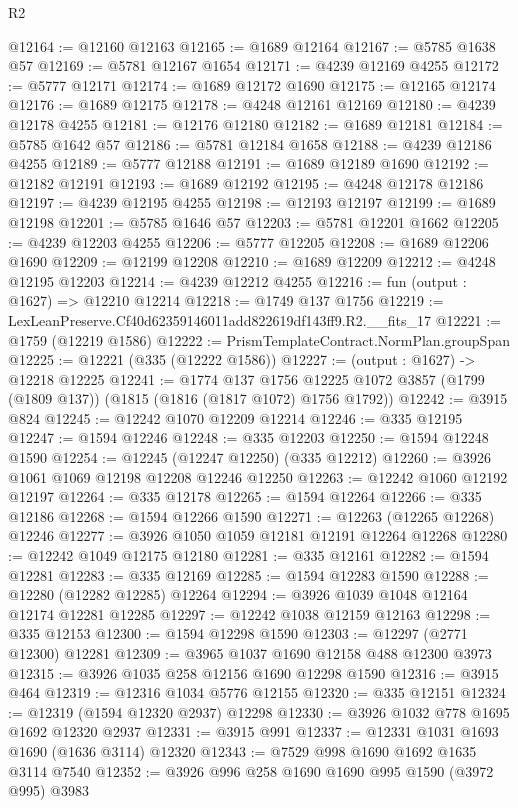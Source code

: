 \begin{lexlean}{R2}
\begin{coremodule}
@12164 := @12160 @12163
@12165 := @1689 @12164
@12167 := @5785 @1638 @57
@12169 := @5781 @12167 @1654
@12171 := @4239 @12169 @4255
@12172 := @5777 @12171
@12174 := @1689 @12172 @1690
@12175 := @12165 @12174
@12176 := @1689 @12175
@12178 := @4248 @12161 @12169
@12180 := @4239 @12178 @4255
@12181 := @12176 @12180
@12182 := @1689 @12181
@12184 := @5785 @1642 @57
@12186 := @5781 @12184 @1658
@12188 := @4239 @12186 @4255
@12189 := @5777 @12188
@12191 := @1689 @12189 @1690
@12192 := @12182 @12191
@12193 := @1689 @12192
@12195 := @4248 @12178 @12186
@12197 := @4239 @12195 @4255
@12198 := @12193 @12197
@12199 := @1689 @12198
@12201 := @5785 @1646 @57
@12203 := @5781 @12201 @1662
@12205 := @4239 @12203 @4255
@12206 := @5777 @12205
@12208 := @1689 @12206 @1690
@12209 := @12199 @12208
@12210 := @1689 @12209
@12212 := @4248 @12195 @12203
@12214 := @4239 @12212 @4255
@12216 := fun (output : @1627) => @12210 @12214
@12218 := @1749 @137 @1756
@12219 := LexLeanPreserve.Cf40d62359146011add822619df143ff9.R2.__fits_17
@12221 := @1759 (@12219 @1586)
@12222 := PrismTemplateContract.NormPlan.groupSpan
@12225 := @12221 (@335 (@12222 @1586))
@12227 := (output : @1627) -> @12218 @12225
@12241 := @1774
    @137
    @1756
    @12225
    @1072
    @3857
    (@1799 (@1809 @137))
    (@1815 (@1816 (@1817 @1072) @1756 @1792))
@12242 := @3915 @824
@12245 := @12242 @1070 @12209 @12214
@12246 := @335 @12195
@12247 := @1594 @12246
@12248 := @335 @12203
@12250 := @1594 @12248 @1590
@12254 := @12245 (@12247 @12250) (@335 @12212)
@12260 := @3926 @1061 @1069 @12198 @12208 @12246 @12250
@12263 := @12242 @1060 @12192 @12197
@12264 := @335 @12178
@12265 := @1594 @12264
@12266 := @335 @12186
@12268 := @1594 @12266 @1590
@12271 := @12263 (@12265 @12268) @12246
@12277 := @3926 @1050 @1059 @12181 @12191 @12264 @12268
@12280 := @12242 @1049 @12175 @12180
@12281 := @335 @12161
@12282 := @1594 @12281
@12283 := @335 @12169
@12285 := @1594 @12283 @1590
@12288 := @12280 (@12282 @12285) @12264
@12294 := @3926 @1039 @1048 @12164 @12174 @12281 @12285
@12297 := @12242 @1038 @12159 @12163
@12298 := @335 @12153
@12300 := @1594 @12298 @1590
@12303 := @12297 (@2771 @12300) @12281
@12309 := @3965 @1037 @1690 @12158 @488 @12300 @3973
@12315 := @3926 @1035 @258 @12156 @1690 @12298 @1590
@12316 := @3915 @464
@12319 := @12316 @1034 @5776 @12155
@12320 := @335 @12151
@12324 := @12319 (@1594 @12320 @2937) @12298
@12330 := @3926 @1032 @778 @1695 @1692 @12320 @2937
@12331 := @3915 @991
@12337 := @12331 @1031 @1693 @1690 (@1636 @3114) @12320
@12343 := @7529 @998 @1690 @1692 @1635 @3114 @7540
@12352 := @3926 @996 @258 @1690 @1690 @995 @1590 (@3972 @995) @3983

\end{coremodule}
\end{lexlean}
